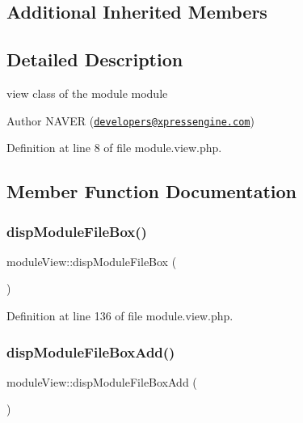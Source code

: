 \subsection*{Additional Inherited Members}


\subsection{Detailed Description}
view class of the module module 

\begin{DoxyAuthor}{Author}
N\+A\+V\+ER (\href{mailto:developers@xpressengine.com}{\tt developers@xpressengine.\+com}) 
\end{DoxyAuthor}


Definition at line 8 of file module.\+view.\+php.



\subsection{Member Function Documentation}
\hypertarget{classmoduleView_a88b4412f774d5b2d54adfad1779a0cc5}{}\label{classmoduleView_a88b4412f774d5b2d54adfad1779a0cc5} 
\subsubsection{\texorpdfstring{disp\+Module\+File\+Box()}{dispModuleFileBox()}}
{\footnotesize\ttfamily module\+View\+::disp\+Module\+File\+Box (\begin{DoxyParamCaption}{ }\end{DoxyParamCaption})}



Definition at line 136 of file module.\+view.\+php.

\hypertarget{classmoduleView_acb1f66a7abc38852dd38b3d133e7f3cc}{}\label{classmoduleView_acb1f66a7abc38852dd38b3d133e7f3cc} 
\subsubsection{\texorpdfstring{disp\+Module\+File\+Box\+Add()}{dispModuleFileBoxAdd()}}
{\footnotesize\ttfamily module\+View\+::disp\+Module\+File\+Box\+Add (\begin{DoxyParamCaption}{ }\end{DoxyParamCaption})}



